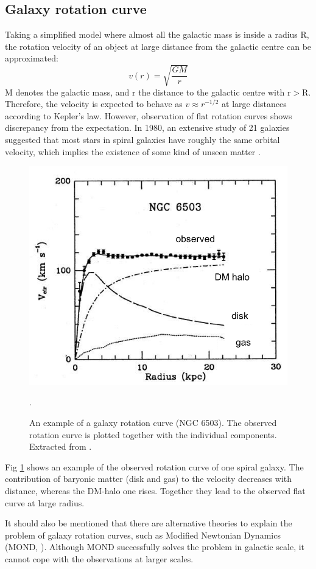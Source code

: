 \subsection*{Galaxy rotation curve}
Taking a simplified model where almost all the galactic mass is inside a radius R, the rotation velocity of an object at large distance from the galactic centre can be approximated:
\begin{equation}
  v(r)=\sqrt{\frac{GM}{r}}
\end{equation}
M denotes the galactic mass, and r the distance to the galactic centre with $\mathrm{r}>\mathrm{R}$. Therefore, the velocity is expected to behave as $v \approx r^{-1/2}$ at large distances according to Kepler's law. However, observation of flat rotation curves shows discrepancy from the expectation. In 1980, an extensive study of 21 galaxies suggested that most stars in spiral galaxies have roughly the same orbital velocity, which implies the existence of some kind of unseen matter \cite{Rub80}.
\begin{figure}[ht]
  \centering
  \includegraphics[width=0.75\textwidth{}]{./fig/rotation_curve.png}
  \caption{ An example of a galaxy rotation curve (NGC 6503). The observed rotation curve is plotted together with the individual components. Extracted from \cite{Rub80}.}.
  \label{fig:rotation-curve}
\end{figure}
Fig \ref{fig:rotation-curve} shows an example of the observed rotation curve of one spiral galaxy. The contribution of baryonic matter (disk and gas) to the velocity decreases with distance, whereas the DM-halo one rises. Together they lead to the observed flat curve at large radius.

It should also be mentioned that there are alternative theories to explain the problem of galaxy rotation curves, such as Modified Newtonian Dynamics (MOND, \cite{Mil83}). Although MOND successfully solves the problem in galactic scale, it cannot cope with the observations at larger scales.

